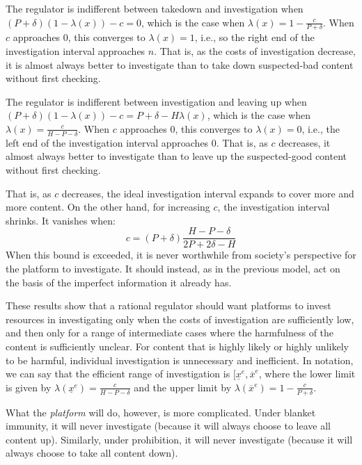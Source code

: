The regulator is indifferent between takedown and investigation when $(P + \delta)(1 - \lambda(x)) - c = 0$, which is the case when $\lambda(x) = 1 - \frac{c}{P + \delta}$. When $c$ approaches $0$, this converges to $\lambda(x) = 1$, i.e., so the right end of the investigation interval approaches $n$. That is, as the costs of investigation decrease, it is almost always better to investigate than to take down suspected-bad content without first checking. 

The regulator is indifferent between investigation and leaving up when $(P + \delta)(1 - \lambda(x)) - c = P + \delta - H\lambda(x)$, which is the case when $\lambda(x) = \frac{c}{H - P - \delta}$. When $c$ approaches $0$, this converges to $\lambda(x) = 0$, i.e., the left end of the investigation interval approaches $0$. That is, as $c$ decreases, it almost always better to investigate than to leave up the suspected-good content without first checking. 

That is, as $c$ decreases, the ideal investigation interval expands to cover more and more content. On the other hand, for increasing $c$, the investigation interval shrinks. It vanishes when:
\begin{equation}
c = (P + \delta)\frac{H - P - \delta}{2P + 2\delta - H}
\end{equation} 
When this bound is exceeded, it is never worthwhile from society's perspective for the platform to investigate. It should instead, as in the previous model, act on the basis of the imperfect information it already has.

These results show that a rational regulator should want platforms to invest resources in investigating only when the costs of investigation are sufficiently low, and then only for a range of intermediate cases where the harmfulness of the content is sufficiently unclear. For content that is highly likely or highly unlikely to be harmful, individual investigation is unnecessary and inefficient. In notation, we can say that the efficient range of investigation is $[\underline{x}^e, \overline{x}^e$, where the lower limit  is given by $\lambda(\underline{x}^e) = \frac{c}{H - P - \delta} $ and the upper limit by $\lambda(\overline{x}^e) = 1 - \frac{c}{P + \delta}$.

What the \emph{platform} will do, however, is more complicated. Under blanket immunity, it will never investigate (because it will always choose to leave all content up). Similarly, under prohibition, it will never investigate (because it will always choose to take all content down). 

